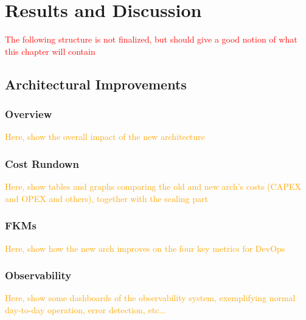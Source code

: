 \chapter{Results and Discussion}\label{results-and-discussion}

\textcolor{red}{The following structure is not finalized, but should give a good notion of what this chapter will contain}

\section{Architectural Improvements}\label{results-and-discussion:s:architectural-improvements}

\subsection{Overview}\label{results-and-discussion:ss:overview}

\textcolor{orange}{Here, show the overall impact of the new architecture}

\subsection{Cost Rundown}\label{results-and-discussion:ss:cost-rundown}

\textcolor{orange}{Here, show tables and graphs comparing the old and new arch's costs (CAPEX and OPEX and others), together with the scaling part}

\subsection{FKMs}\label{results-and-discussion:ss:fkms}

\textcolor{orange}{Here, show how the new arch improves on the four key metrics for DevOps}

\subsection{Observability}\label{results-and-discussion:ss:observability}

\textcolor{orange}{Here, show some dashboards of the observability system, exemplifying normal day-to-day operation, error detection, etc...}

